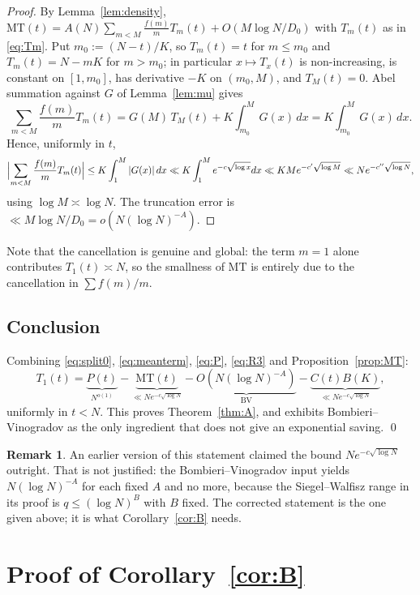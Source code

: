 \documentclass[11pt,a4paper]{article}
\theoremstyle{plain}
\theoremstyle{definition}
\newtheorem{remark}[theorem]{Remark}
\begin{document}
\begin{proof}
By Lemma~\ref{lem:density},
$\mathrm{MT}(t)=A(N)\sum_{m<M}\frac{f(m)}{m}T_m(t)+O(M\log N/D_0)$
with $T_m(t)$ as in \eqref{eq:Tm}. Put $m_0:=(N-t)/K$, so
$T_m(t)=t$ for $m\le m_0$ and $T_m(t)=N-mK$ for $m>m_0$; in particular
$x\mapsto T_x(t)$ is non-increasing, is constant on $[1,m_0]$, has
derivative $-K$ on $(m_0,M)$, and $T_M(t)=0$. Abel summation against
$G$ of Lemma~\ref{lem:mu} gives
\[
  \sum_{m<M}\frac{f(m)}{m}T_m(t)
  = G(M)\,T_M(t) + K\!\int_{m_0}^{M}\! G(x)\,dx
  = K\!\int_{m_0}^{M}\! G(x)\,dx .
\]
Hence, uniformly in $t$,
\[
  \Bigl|\sum_{m<M}\frac{f(m)}{m}T_m(t)\Bigr|
  \le K\int_{1}^{M}|G(x)|\,dx
  \ll K\int_1^M e^{-c\sqrt{\log x}}dx
  \ll KM e^{-c'\sqrt{\log M}} \ll N e^{-c''\sqrt{\log N}},
\]
using $\log M\asymp\log N$. The truncation error is
$\ll M\log N/D_0=o(N(\log N)^{-A})$.
\end{proof}

Note that the cancellation is genuine and global: the term $m=1$ alone
contributes $T_1(t)\asymp N$, so the smallness of $\mathrm{MT}$ is
entirely due to the cancellation in $\sum f(m)/m$.

\subsection{Conclusion}

Combining \eqref{eq:split0}, \eqref{eq:meanterm}, \eqref{eq:P},
\eqref{eq:R3} and Proposition~\ref{prop:MT}:
\[
  T_1(t) = \underbrace{P(t)}_{N^{o(1)}}
         - \underbrace{\mathrm{MT}(t)}_{\ll Ne^{-c\sqrt{\log N}}}
         - \underbrace{O\!\left(N(\log N)^{-A}\right)}_{\text{BV}}
         - \underbrace{C(t)B(K)}_{\ll Ne^{-c\sqrt{\log N}}},
\]
uniformly in $t<N$. This proves Theorem~\ref{thm:A}, and exhibits
Bombieri--Vinogradov as the only ingredient that does not give an
exponential saving. \qed

\begin{remark}\label{rem:bound}
An earlier version of this statement claimed the bound
$Ne^{-c\sqrt{\log N}}$ outright. That is not justified: the
Bombieri--Vinogradov input yields $N(\log N)^{-A}$ for each fixed $A$
and no more, because the Siegel--Walfisz range in its proof is
$q\le(\log N)^{B}$ with $B$ fixed. The corrected statement is the one
given above; it is what Corollary~\ref{cor:B} needs.
\end{remark}

\section{Proof of Corollary~\ref{cor:B}}
\end{document}
